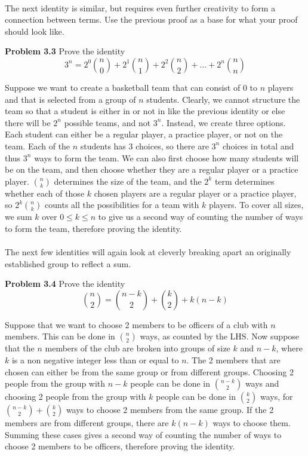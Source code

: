 \documentclass[11pt]{scrartcl}
\begin{document}
\\
\noindent 
The next identity is similar, but requires even further creativity to form a connection between terms. Use the previous proof as a base for what your proof should look like. 
\\
\begin{tcolorbox}
\textbf{Problem 3.3} Prove the identity
$$3^n=2^0{n \choose 0}+2^1{n \choose 1}+2^2{n \choose 2}+...+2^n{n \choose n}$$
\end{tcolorbox}
\noindent 
Suppose we want to create a basketball team that can consist of 0 to $n$ players and that is selected from a group of $n$ students. Clearly, we cannot structure the team so that a student is either in or not in like the previous identity or else there will be $2^n$ possible teams, and not $3^n$. Instead, we create three options. Each student can either be a regular player, a practice player, or not on the team. Each of the $n$ students has 3 choices, so there are $3^n$ choices in total and thus $3^n$ ways to form the team. We can also first choose how many students will be on the team, and then choose whether they are a regular player or a practice player. ${n \choose k}$ determines the size of the team, and the $2^k$ term determines whether each of those $k$ chosen players are a regular player or a practice player, so $2^k{n \choose k}$ counts all the possibilities for a team with $k$ players. To cover all sizes, we sum $k$ over $0 \leq k \leq n$ to give us a second way of counting the number of ways to form the team, therefore proving the identity.\\
\\
\noindent 
The next few identities will again look at cleverly breaking apart an originally established group to reflect a sum.
\\
\begin{tcolorbox}
\textbf{Problem 3.4} Prove the identity
$${n \choose 2}={{n-k} \choose 2}+{k \choose 2}+k(n-k)$$
\end{tcolorbox}
\noindent 
Suppose that we want to choose 2 members to be officers of a club with $n$ members. This can be done in $n \choose 2$ ways, as counted by the LHS. Now suppose that the $n$ members of the club are broken into groups of size $k$ and $n-k$, where $k$ is a non negative integer less than or equal to $n$. The 2 members that are chosen can either be from the same group or from different groups. Choosing 2 people from the group with $n-k$ people can be done in ${n-k} \choose 2$ ways and choosing 2 people from the group with $k$ people can be done in $k \choose 2$ ways, for ${{n-k} \choose 2} + {{k} \choose 2}$ ways to choose 2 members from the same group. If the 2 members are from different groups, there are $k(n-k)$ ways to choose them. Summing these cases gives a second way of counting the number of ways to choose 2 members to be officers, therefore proving the identity. \\
\end{document}
